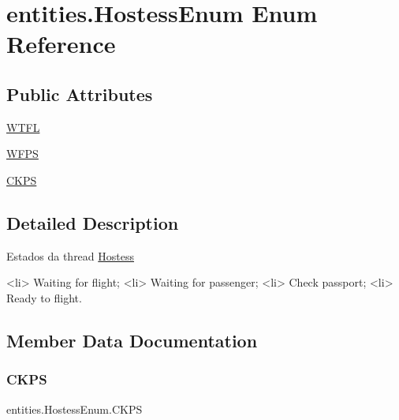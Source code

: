 \hypertarget{enumentities_1_1_hostess_enum}{}\section{entities.\+Hostess\+Enum Enum Reference}
\label{enumentities_1_1_hostess_enum}
\subsection*{Public Attributes}
\begin{DoxyCompactItemize}
\item 
\hyperlink{enumentities_1_1_hostess_enum_a01812c97c05d14294edfd377744a1b0d}{W\+T\+FL}
\item 
\hyperlink{enumentities_1_1_hostess_enum_a7dd1a5f1d4e0b7db465569db96495372}{W\+F\+PS}
\item 
\hyperlink{enumentities_1_1_hostess_enum_a1e448e74ddf0ddaad9f27e2052a8e50f}{C\+K\+PS}
\end{DoxyCompactItemize}


\subsection{Detailed Description}
Estados da thread \hyperlink{classentities_1_1_hostess}{Hostess} \begin{DoxyVerb}<li> Waiting for flight;
<li> Waiting for passenger;
<li> Check passport;
<li> Ready to flight.\end{DoxyVerb}
 

\subsection{Member Data Documentation}
\mbox{\label{enumentities_1_1_hostess_enum_a1e448e74ddf0ddaad9f27e2052a8e50f}} 
\subsubsection{\texorpdfstring{C\+K\+PS}{CKPS}}
{\footnotesize\ttfamily entities.\+Hostess\+Enum.\+C\+K\+PS}

\mbox{\label{enumentities_1_1_hostess_enum_a7dd1a5f1d4e0b7db465569db96495372}} 
